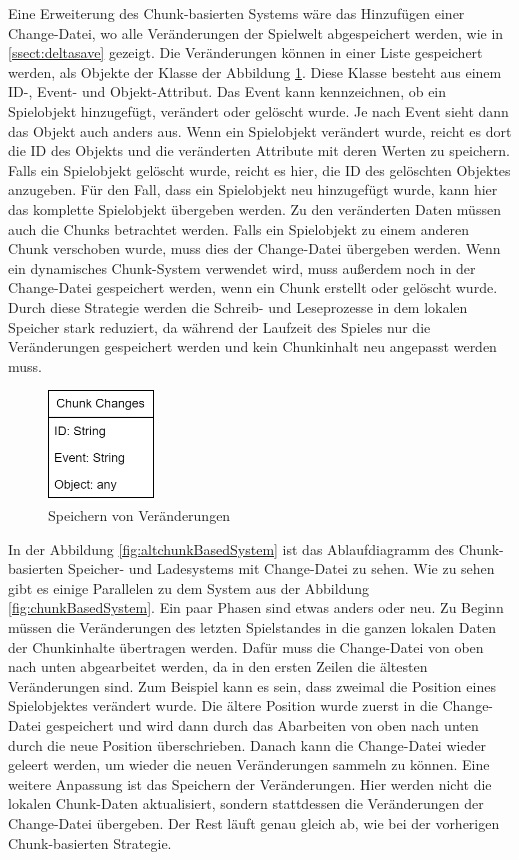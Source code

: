 Eine Erweiterung des Chunk-basierten Systems wäre das Hinzufügen einer Change-Datei, wo alle Veränderungen der Spielwelt abgespeichert werden, wie in \ref{ssect:deltasave} gezeigt. Die Veränderungen können in einer Liste gespeichert werden, als Objekte der Klasse der Abbildung \ref{fig:changesClass}. Diese Klasse besteht aus einem ID-, Event- und Objekt-Attribut. Das Event kann kennzeichnen, ob ein Spielobjekt hinzugefügt, verändert oder gelöscht wurde. Je nach Event sieht dann das Objekt auch anders aus. Wenn ein Spielobjekt verändert wurde, reicht es dort die ID des Objekts und die veränderten Attribute mit deren Werten zu speichern. Falls ein Spielobjekt gelöscht wurde, reicht es hier, die ID des gelöschten Objektes anzugeben. Für den Fall, dass ein Spielobjekt neu hinzugefügt wurde, kann hier das komplette Spielobjekt übergeben werden. Zu den veränderten Daten müssen auch die Chunks betrachtet werden. Falls ein Spielobjekt zu einem anderen Chunk verschoben wurde, muss dies der Change-Datei übergeben werden. Wenn ein dynamisches Chunk-System verwendet wird, muss außerdem noch in der Change-Datei gespeichert werden, wenn ein Chunk erstellt oder gelöscht wurde. Durch diese Strategie werden die Schreib- und Leseprozesse in dem lokalen Speicher stark reduziert, da während der Laufzeit des Spieles nur die Veränderungen gespeichert werden und kein Chunkinhalt neu angepasst werden muss.

\begin{figure}[htp]
    \centering
    \includegraphics[width=0.25\textwidth]{images/Changes.png}
    \caption{Speichern von Veränderungen}
    \label{fig:changesClass}
\end{figure}

In der Abbildung \ref{fig:altchunkBasedSystem} ist das Ablaufdiagramm des Chunk-basierten Speicher- und Ladesystems mit Change-Datei zu sehen. Wie zu sehen gibt es einige Parallelen zu dem System aus der Abbildung \ref{fig:chunkBasedSystem}. Ein paar Phasen sind etwas anders oder neu. Zu Beginn müssen die Veränderungen des letzten Spielstandes in die ganzen lokalen Daten der Chunkinhalte übertragen werden. Dafür muss die Change-Datei von oben nach unten abgearbeitet werden, da in den ersten Zeilen die ältesten Veränderungen sind. Zum Beispiel kann es sein, dass zweimal die Position eines Spielobjektes verändert wurde. Die ältere Position wurde zuerst in die Change-Datei gespeichert und wird dann durch das Abarbeiten von oben nach unten durch die neue Position überschrieben. Danach kann die Change-Datei wieder geleert werden, um wieder die neuen Veränderungen sammeln zu können. Eine weitere Anpassung ist das Speichern der Veränderungen. Hier werden nicht die lokalen Chunk-Daten aktualisiert, sondern stattdessen die Veränderungen der Change-Datei übergeben. Der Rest läuft genau gleich ab, wie bei der vorherigen Chunk-basierten Strategie.

